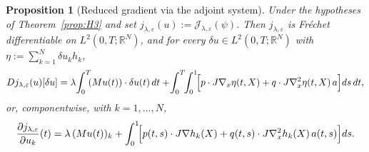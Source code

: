 \documentclass[10pt,a4paper]{amsart}
\newtheorem{prop}{Proposition}
\begin{document}
\begin{prop}[Reduced gradient via the adjoint system]\label{prop:adjoint}
Under the hypotheses of Theorem~\ref{prop:H3} and set $j_{\lambda,\varepsilon}(u):=\mathcal J_{\lambda,\varepsilon}(\psi)$. Then $j_{\lambda,\varepsilon}$ is Fr\'echet differentiable on $L^2(0,T;\mathbb R^N)$, and for every $\delta u\in L^2(0,T;\mathbb R^N)$ with $\eta:=\sum_{k=1}^N\delta u_k h_k$,
\begin{align}\label{eq:DJ}
Dj_{\lambda,\varepsilon}(u)[\delta u]
=\lambda\!\int_0^T\!\!(Mu(t))\cdot\delta u(t)\,dt
+\!\int_0^T\!\!\int_0^1\!\Bigl[p\cdot J\nabla_x\eta(t,X)+q\cdot J\nabla_x^2\eta(t,X)\,a\Bigr]ds\,dt,
\end{align}
or, componentwise, with $k=1,\dots,N$,
\begin{equation}\label{eq:grad_uk}
\frac{\partial j_{\lambda,\varepsilon}}{\partial u_k}(t)
=\lambda\,(Mu(t))_k+\int_0^1\!\Bigl[p(t,s)\cdot J\nabla h_k(X)+q(t,s)\cdot J\nabla_x^2 h_k(X)\,a(t,s)\Bigr]ds.
\end{equation}
\end{prop}
\end{document}
